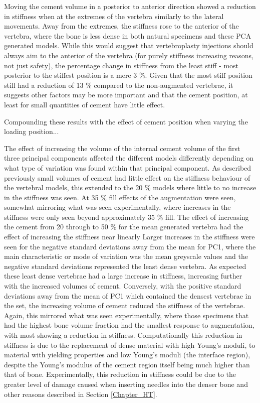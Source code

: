 Moving the cement volume in a posterior to anterior direction showed a reduction in stiffness when at the extremes of the vertebra similarly to the lateral movements.
Away from the extremes, the stiffness rose to the anterior of the vertebra, where the bone is less dense in both natural specimens and these PCA generated models.
While this would suggest that vertebroplasty injections should always aim to the anterior of the vertebra (for purely stiffness increasing reasons, not just safety), the percentage change in stiffness from the least stiff - most posterior to the stiffest position is a mere 3 \%.
Given that the most stiff position still had a reduction of 13 \% compared to the non-augmented vertebrae, it suggests other factors may be more important and that the cement position, at least for small quantities of cement have little effect.

Compounding these results with the effect of cement position when varying the loading position... %

The effect of increasing the volume of the internal cement volume of the first three principal components affected the different models differently depending on what type of variation was found within that principal component.
As described previously small volumes of cement had little effect on the stiffness behaviour of the vertebral models, this extended to the 20 \% models where little to no increase in the stiffness was seen.
At 35 \% fill effects of the augmentation were seen, somewhat mirroring what was seen experimentally, where increases in the stiffness were only seen beyond approximately 35 \% fill.
The effect of increasing the cement from 20 through to 50 \% for the mean generated vertebra had the effect of increasing the stiffness near linearly %
Larger increases in the stiffness were seen for the negative standard deviations away from the mean for PC1, where the main characteristic or mode of variation was the mean greyscale values and the negative standard deviations represented the least dense vertebra.
As expected these least dense vertebrae had a large increase in stiffness, increasing further with the increased volumes of cement.
Conversely, with the positive standard deviations away from the mean of PC1 which contained the densest vertebrae in the set, the increasing volume of cement reduced the stiffness of the vertebrae.
Again, this mirrored what was seen experimentally, where those specimens that had the highest bone volume fraction %
had the smallest response to augmentation, with most showing a reduction in stiffness.
Computationally this reduction in stiffness is due to the replacement of dense material with high Young's moduli, to material with yielding properties and low Young's moduli (the interface region), despite the Young's modulus of the cement region itself being much higher than that of bone.
Experimentally, this reduction in stiffness could be due to the greater level of damage caused when inserting needles into the denser bone and other reasons described in Section \ref{Chapter_HT}. %

